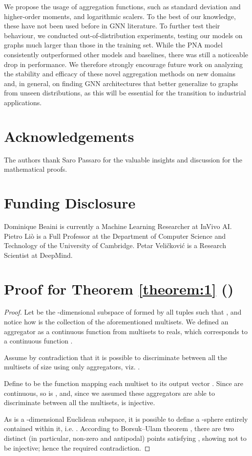 \documentclass{article}
\begin{document}
We propose the usage of aggregation functions, such as standard deviation and higher-order moments, and logarithmic scalers. To the best of our knowledge, these have not been used before in GNN literature. To further test their behaviour, we conducted out-of-distribution experiments, testing our models on graphs much larger than those in the training set. While the PNA model consistently outperformed other models and baselines, there was still a noticeable drop in performance. We therefore strongly encourage future work on analyzing the stability and efficacy of these novel aggregation methods on new domains and, in general, on finding GNN architectures that better generalize to graphs from unseen distributions, as this will be essential for the transition to industrial applications.

\section*{Acknowledgements}
The authors thank Saro Passaro for the valuable insights and discussion for the mathematical proofs.

\section*{Funding Disclosure}
Dominique Beaini is currently a Machine Learning Researcher at InVivo AI. Pietro Li\`{o} is a Full Professor at the Department of Computer Science and Technology of the University of Cambridge. Petar Veli\v{c}kovi\'{c} is a Research Scientist at DeepMind.





\newpage

\appendix

\section{Proof for Theorem \ref{theorem:1} ()}
\label{app:proof_th1}
\begin{proof}
Let  be the -dimensional subspace of  formed by all tuples  such that , and notice how  is the collection of the aforementioned multisets. We defined an aggregator as a continuous function from multisets to reals, which corresponds to a continuous function .

Assume by contradiction that it is possible to discriminate between all the multisets of size  using only  aggregators, viz. .

Define  to be the function mapping each multiset  to its output vector .
Since  are continuous, so is , and, since we assumed these aggregators are able to discriminate between all the multisets,  is injective.

As  is a -dimensional Euclidean subspace, it is possible to define a -sphere  entirely contained within it, i.e. . According to Borsuk–Ulam theorem \cite{rotman_introduction_1988, borsuk}, there are two distinct (in particular, non-zero and antipodal) points  satisfying , showing  not to be injective; hence the required contradiction.
\end{proof}
\end{document}
